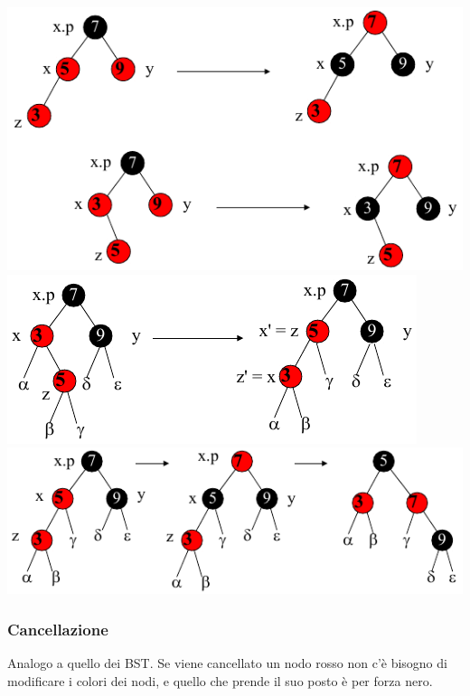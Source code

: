\documentclass[10pt,a4paper]{article}
\begin{document}
\begin{multicols*}{2}
\centering
\vspace{1em}
\includegraphics[width=\linewidth, scale=0.9]{rb_insert_fixup_1.png}
\vspace{1em}
\includegraphics[width=\linewidth, scale=0.9]{rb_insert_fixup_2.png}
\vspace{1em}
\includegraphics[width=\linewidth, scale=0.9]{rb_insert_fixup_3.png}
\justifying

\subsubsection*{Cancellazione}
Analogo a quello dei BST. Se viene cancellato un nodo rosso non c'è bisogno di modificare i colori dei nodi, e quello che prende il suo posto è per forza nero.


\end{multicols*}
\end{document}
